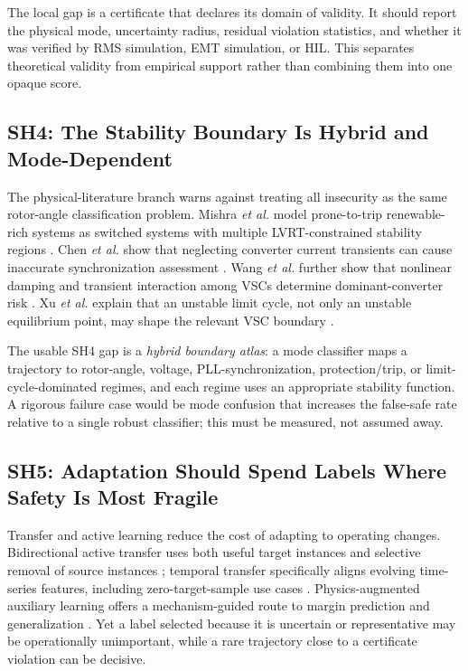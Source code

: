\documentclass[conference]{IEEEtran}
\begin{document}
The local gap is a certificate that declares its domain of validity. It should report the physical mode, uncertainty radius, residual violation statistics, and whether it was verified by RMS simulation, EMT simulation, or HIL. This separates theoretical validity from empirical support rather than combining them into one opaque score.

\subsection{SH4: The Stability Boundary Is Hybrid and Mode-Dependent}

The physical-literature branch warns against treating all insecurity as the same rotor-angle classification problem. Mishra \emph{et al.} model prone-to-trip renewable-rich systems as switched systems with multiple LVRT-constrained stability regions \cite{mishra2019}. Chen \emph{et al.} show that neglecting converter current transients can cause inaccurate synchronization assessment \cite{chen2020}. Wang \emph{et al.} further show that nonlinear damping and transient interaction among VSCs determine dominant-converter risk \cite{wang2024}. Xu \emph{et al.} explain that an unstable limit cycle, not only an unstable equilibrium point, may shape the relevant VSC boundary \cite{xu2025}.

The usable SH4 gap is a \emph{hybrid boundary atlas}: a mode classifier maps a trajectory to rotor-angle, voltage, PLL-synchronization, protection/trip, or limit-cycle-dominated regimes, and each regime uses an appropriate stability function. A rigorous failure case would be mode confusion that increases the false-safe rate relative to a single robust classifier; this must be measured, not assumed away.

\subsection{SH5: Adaptation Should Spend Labels Where Safety Is Most Fragile}

Transfer and active learning reduce the cost of adapting to operating changes. Bidirectional active transfer uses both useful target instances and selective removal of source instances \cite{shi2023}; temporal transfer specifically aligns evolving time-series features, including zero-target-sample use cases \cite{liu2025}. Physics-augmented auxiliary learning offers a mechanism-guided route to margin prediction and generalization \cite{shen2025}. Yet a label selected because it is uncertain or representative may be operationally unimportant, while a rare trajectory close to a certificate violation can be decisive.
\end{document}
